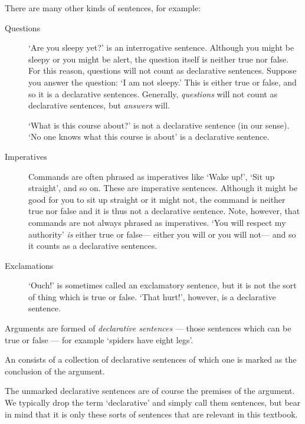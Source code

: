 There are many other kinds of sentences, for example:
\begin{description}
\item[{Questions}] `Are you sleepy yet?' is an interrogative sentence. Although you might be sleepy or you might be alert, the question itself is neither true nor false. For this reason, questions will not count as declarative sentences. Suppose you answer the question: `I am not sleepy.' This is either true or false, and so it is a declarative sentences. Generally, \emph{questions} will not count as declarative sentences, but \emph{answers} will.

`What is this course about?' is not a declarative sentence (in our sense). `No one knows what this course is about' is a declarative sentence.

\item[{Imperatives}] Commands are often phrased as imperatives like `Wake up!', `Sit up straight', and so on. These are imperative sentences. Although it might be good for you to sit up straight or it might not, the command is neither true nor false and it is thus not a declarative sentence. Note, however, that commands are not always phrased as imperatives. `You will respect my authority' \emph{is} either true or false--- either you will or you will not--- and so it counts as a declarative sentences.

\item[{Exclamations}] `Ouch!' is sometimes called an exclamatory sentence, but it is not the sort of thing which is true or false. `That hurt!', however, is a declarative sentence.

\end{description}

Arguments are formed of \emph{declarative sentences} --- those sentences which can be true or false --- for example `spiders have eight legs'.

\begin{definition}An  consists of a collection of declarative sentences of which one is marked as the conclusion of the argument.\end{definition}


The unmarked declarative sentences are of course the premises of the argument. We typically drop the term `declarative' and simply call them sentences, but bear in mind that it is only these sorts of sentences that are relevant in this textbook.


